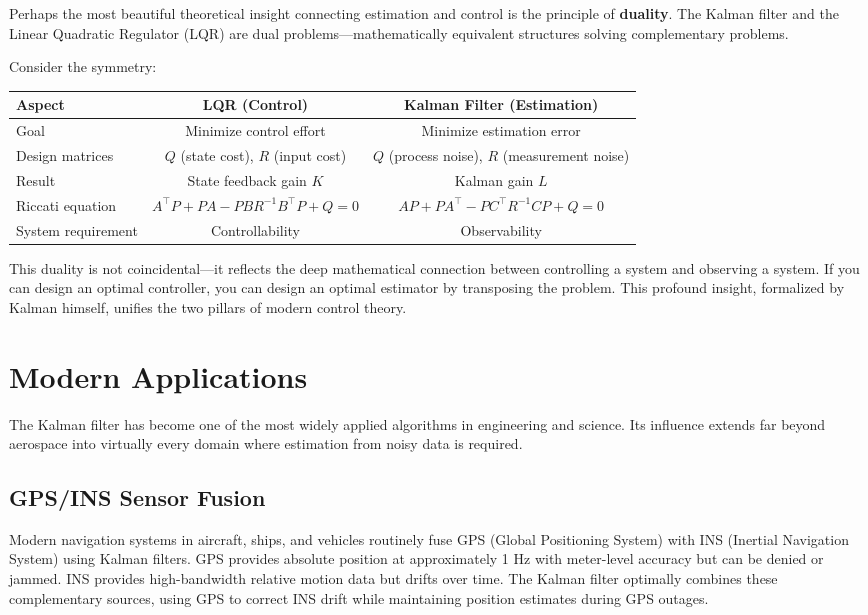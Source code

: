 Perhaps the most beautiful theoretical insight connecting estimation and control is the principle of \textbf{duality}. The Kalman filter and the Linear Quadratic Regulator (LQR) are dual problems---mathematically equivalent structures solving complementary problems.

Consider the symmetry:
\begin{center}
\begin{tabular}{lcc}
\toprule
\textbf{Aspect} & \textbf{LQR (Control)} & \textbf{Kalman Filter (Estimation)} \\
\midrule
Goal & Minimize control effort & Minimize estimation error \\
Design matrices & $Q$ (state cost), $R$ (input cost) & $Q$ (process noise), $R$ (measurement noise) \\
Result & State feedback gain $K$ & Kalman gain $L$ \\
Riccati equation & $A^\top P + PA - PBR^{-1}B^\top P + Q = 0$ & $AP + PA^\top - PC^\top R^{-1}CP + Q = 0$ \\
System requirement & Controllability & Observability \\
\bottomrule
\end{tabular}
\end{center}

This duality is not coincidental---it reflects the deep mathematical connection between controlling a system and observing a system. If you can design an optimal controller, you can design an optimal estimator by transposing the problem. This profound insight, formalized by Kalman himself, unifies the two pillars of modern control theory.

\section{Modern Applications}

The Kalman filter has become one of the most widely applied algorithms in engineering and science. Its influence extends far beyond aerospace into virtually every domain where estimation from noisy data is required.

\subsection{GPS/INS Sensor Fusion}

Modern navigation systems in aircraft, ships, and vehicles routinely fuse GPS (Global Positioning System) with INS (Inertial Navigation System) using Kalman filters. GPS provides absolute position at approximately 1 Hz with meter-level accuracy but can be denied or jammed. INS provides high-bandwidth relative motion data but drifts over time. The Kalman filter optimally combines these complementary sources, using GPS to correct INS drift while maintaining position estimates during GPS outages.

